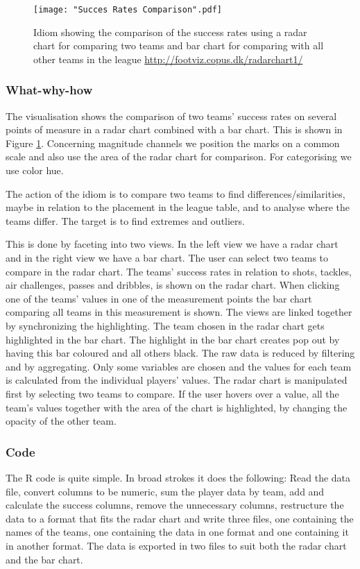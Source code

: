 \documentclass[Report.tex]{subfiles}
\begin{document}
\begin{figure}
\center
\texttt{[image: "Succes Rates Comparison".pdf]}
\caption{Idiom showing the comparison of the success rates using a radar chart for comparing two teams and bar chart for comparing with all other teams in the league \url{http://footviz.copus.dk/radarchart1/}}
\label{Fig:SuccesRates}
\end{figure}


\subsubsection{What-why-how}
The visualisation shows the comparison of two teams' success rates on several points of measure in a radar chart combined with a bar chart. This is shown in Figure \ref{Fig:SuccesRates}. Concerning magnitude channels we position the marks on a common scale and also use the area of the radar chart for comparison. For categorising we use color hue.

The action of the idiom is to compare two teams to find differences/similarities, maybe in relation to the placement in the league table, and to analyse where the teams differ. The target is to find extremes and outliers.

This is done by faceting into two views. In the left view we have a radar chart and in the right view we have a bar chart. The user can select two teams to compare in the radar chart. The teams' success rates in relation to shots, tackles, air challenges, passes and dribbles, is shown on the radar chart. When clicking one of the teams' values in one of the measurement points the bar chart comparing all teams in this measurement is shown. The views are linked together by synchronizing the highlighting. The team chosen in the radar chart gets highlighted in the bar chart. The highlight in the bar chart creates pop out by having this bar coloured and all others black.
The raw data is reduced by filtering and by aggregating. Only some variables are chosen and the values for each team is calculated from the individual players' values. 
The radar chart is manipulated first by selecting two teams to compare. If the user hovers over a value, all the team's values together with the area of the chart is highlighted, by changing the opacity of the other team.
\subsubsection{Code}
The R code is quite simple. In broad strokes it does the following: Read the data file, convert columns to be numeric, sum the player data by team, add and calculate the success columns, remove the unnecessary columns, restructure the data to a format that fits the radar chart and write three files, one containing the names of the teams, one containing the data in one format and one containing it in another format. The data is exported in two files to suit both the radar chart and the bar chart.
\end{document}
